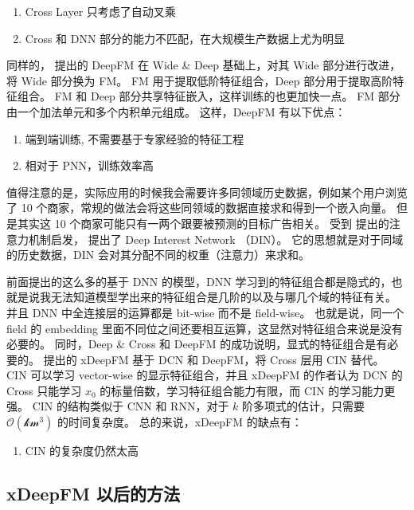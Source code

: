 \documentclass[degree=master,cjk-font=noto]{thuthesis}
\begin{document}
\begin{enumerate}
  \item Cross Layer 只考虑了自动叉乘
  \item Cross 和 DNN 部分的能力不匹配，在大规模生产数据上尤为明显
\end{enumerate}

同样的，\cite{deepfm} 提出的 DeepFM 在 Wide \& Deep 基础上，对其 Wide 部分进行改进，将 Wide 部分换为 FM。
FM 用于提取低阶特征组合，Deep 部分用于提取高阶特征组合。
FM 和 Deep 部分共享特征嵌入，这样训练的也更加快一点。
FM 部分由一个加法单元和多个内积单元组成。
这样，DeepFM 有以下优点：

\begin{enumerate}
  \item 端到端训练, 不需要基于专家经验的特征工程
  \item 相对于 PNN，训练效率高
\end{enumerate}

值得注意的是，实际应用的时候我会需要许多同领域历史数据，例如某个用户浏览了 10 个商家，常规的做法会将这些同领域的数据直接求和得到一个嵌入向量。
但是其实这 10 个商家可能只有一两个跟要被预测的目标广告相关。
受到 \cite{attention} 提出的注意力机制启发，\cite{din} 提出了 Deep Interest Network （DIN）。
它的思想就是对于同域的历史数据，DIN 会对其分配不同的权重（注意力）来求和。

前面提出的这么多的基于 DNN 的模型，DNN 学习到的特征组合都是隐式的，也就是说我无法知道模型学出来的特征组合是几阶的以及与哪几个域的特征有关。
并且 DNN 中全连接层的运算都是 bit-wise 而不是 field-wise。
也就是说，同一个 field 的 embedding 里面不同位之间还要相互运算，这显然对特征组合来说是没有必要的。
同时，Deep \& Cross 和 DeepFM 的成功说明，显式的特征组合是有必要的。
\cite{xdeepfm} 提出的 xDeepFM 基于 DCN 和 DeepFM，将 Cross 层用 CIN 替代。
CIN 可以学习 vector-wise 的显示特征组合，并且 xDeepFM 的作者认为 DCN 的 Cross 只能学习 $x_0$ 的标量倍数，学习特征组合能力有限，而 CIN 的学习能力更强。
CIN 的结构类似于 CNN 和 RNN，对于 $k$ 阶多项式的估计，只需要 $\mathcal{O(km^3)}$ 的时间复杂度。
总的来说，xDeepFM 的缺点有：

\begin{enumerate}
  \item CIN 的复杂度仍然太高
\end{enumerate}

\subsection{xDeepFM 以后的方法}
\label{sec:after_xeepfm}
\end{document}
